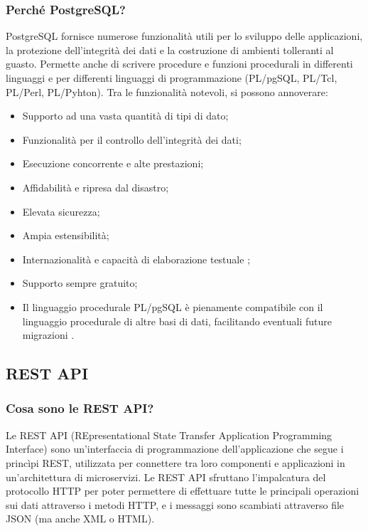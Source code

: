             \subsubsection{Perché PostgreSQL?}
                PostgreSQL fornisce numerose funzionalità utili per lo sviluppo delle applicazioni, la protezione dell'integrità dei dati e la costruzione di ambienti tolleranti al guasto. Permette anche di scrivere procedure e funzioni procedurali in differenti linguaggi e per differenti linguaggi di programmazione (PL/pgSQL, PL/Tcl, PL/Perl, PL/Pyhton). Tra le funzionalità notevoli, si possono annoverare:
                \begin{itemize}
                    \item Supporto ad una vasta quantità di tipi di dato;
                    \item Funzionalità per il controllo dell'integrità dei dati;
                    \item Esecuzione concorrente e alte prestazioni;
                    \item Affidabilità e ripresa dal disastro;
                    \item Elevata sicurezza;
                    \item Ampia estensibilità;
                    \item Internazionalità e capacità di elaborazione testuale \cite{PostgreSQL1}; 
                    \item Supporto sempre gratuito;
                    \item Il linguaggio procedurale PL/pgSQL è pienamente compatibile con il linguaggio procedurale di altre basi di dati, facilitando eventuali future migrazioni \cite{Hevodata1}.
                \end{itemize}

        \subsection{REST API}
            \subsubsection{Cosa sono le REST API? \cite{IBM1}}
                Le REST API (REpresentational State Transfer Application Programming Interface) sono un'interfaccia di programmazione dell'applicazione che segue i princìpi REST, utilizzata per connettere tra loro componenti e applicazioni in un'architettura di microservizi. Le REST API sfruttano l'impalcatura del protocollo HTTP per poter permettere di effettuare tutte le principali operazioni sui dati attraverso i metodi HTTP, e i messaggi sono scambiati attraverso file JSON (ma anche XML o HTML).

